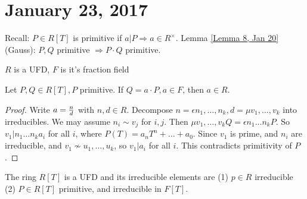 \section{January 23, 2017}
\noindent Recall: $P\in R[T]$ is primitive if $a|P\Longrightarrow a\in R^{\times}$.
Lemma \ref{Lemma 8, Jan 20} (Gauss): $P,Q$ primitive $\Longrightarrow P\cdot Q$ primitive.

\noindent $R$ is a UFD, $F$ is it's fraction field
\begin{lemma} \label{Lemma 1, Jan 23}
    Let $P,Q\in R[T], P$ primitive. If $Q=a\cdot P, a\in F$, then $a\in R$.
\end{lemma}
\begin{proof}
    Write $a={n\over d}$ with $n,d\in R$. Decompose $n=\epsilon n_1,\ldots, n_k,d=\mu v_1,\ldots,v_k$ into irreducibles. We may assume $n_i\sim v_j$ for $i,j$. Then $\mu v_1,\ldots, v_kQ=\epsilon   n_1\ldots n_k P$. So $v_1|n_1\ldots n_ka_i$ for all $i$, where $P(T)=a_nT^n+\ldots+a_0$. Since $v_1$ is prime, and $n_i$ are irreducible, and $v_1\nsim u_1,\ldots, u_k$, so $v_1|a_i$ for all $i$. This contradicts primitivity of $P$.
\end{proof}
\begin{thm} \label{Thm 2, Jan 23}
    The ring $R[T]$ is a UFD and its irreducible elements are
    (1) $p\in R$ irreducible
    (2) $P\in R[T]$ primitive, and irreducible in $F[T]$.
\end{thm}
